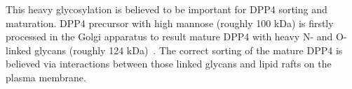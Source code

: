 This heavy glycosylation is believed to be important for DPP4 sorting and maturation. DPP4 precursor with high mannose (roughly 100 kDa) is firstly processed in the Golgi apparatus to result mature DPP4 with heavy N- and O-linked glycans (roughly 124 kDa)~\cite{Matter_1991}. The correct sorting of the mature DPP4 is believed via interactions between those linked glycans and lipid rafts on the plasma membrane.
\par
